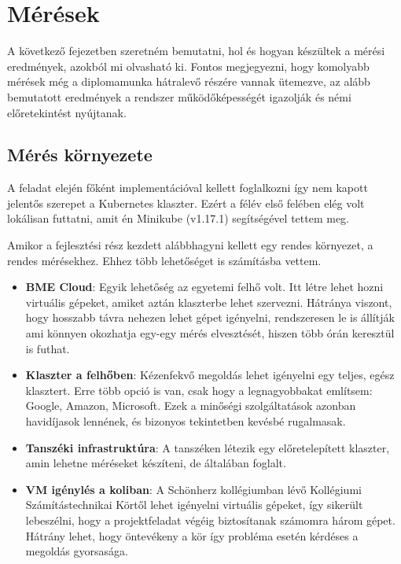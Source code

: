 \chapter{Mérések}
\label{sec:results}

A következő fejezetben szeretném bemutatni, hol és hogyan készültek a mérési eredmények, azokból mi olvasható ki. Fontos megjegyezni, hogy komolyabb mérések még a diplomamunka hátralevő részére vannak ütemezve, az alább bemutatott eredmények a rendszer működőképességét igazolják és némi előretekintést nyújtanak.

\section{Mérés környezete}
A feladat elején főként implementációval kellett foglalkozni így nem kapott jelentős szerepet a Kubernetes klaszter. Ezért  a félév első felében elég volt lokálisan futtatni, amit én Minikube (v1.17.1) segítségével tettem meg. 

Amikor a fejlesztési rész kezdett alábbhagyni kellett egy rendes környezet, a rendes mérésekhez. Ehhez több lehetőséget is számításba vettem.	

\begin{itemize}
  \item \textbf{BME Cloud}: Egyik lehetőség az egyetemi felhő volt. Itt létre lehet hozni virtuális gépeket, amiket aztán klaszterbe lehet szervezni. Hátránya viszont, hogy hosszabb távra nehezen lehet gépet igényelni, rendszeresen le is állítják ami könnyen okozhatja egy-egy mérés elvesztését, hiszen több órán keresztül is futhat.
  \item \textbf{Klaszter a felhőben}: Kézenfekvő megoldás lehet igényelni egy teljes, egész klasztert. Erre több opció is van, csak hogy a legnagyobbakat említsem: Google, Amazon, Microsoft. Ezek a minőségi szolgáltatások azonban havidíjasok lennének, és bizonyos tekintetben kevésbé rugalmasak.
    \item \textbf{Tanszéki infrastruktúra}: A tanszéken létezik egy előretelepített klaszter, amin lehetne méréseket készíteni, de általában foglalt.
      \item \textbf{VM igénylés a koliban}: A Schönherz kollégiumban lévő Kollégiumi Számítástechnikai Körtől lehet igényelni virtuális gépeket, így sikerült lebeszélni, hogy a projektfeladat végéig biztosítanak számomra három gépet. Hátrány lehet, hogy öntevékeny a kör így probléma esetén kérdéses a megoldás gyorsasága. 
\end{itemize}		

